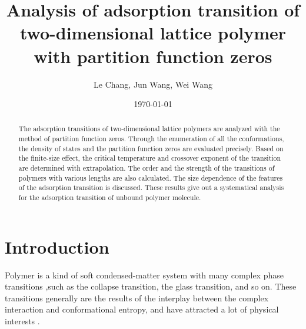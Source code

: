 \documentclass[aps,pre,twocolumn,showpacs,preprintnumbers,amsmath,amssymb]{revtex4-1}
\begin{document}
\title{Analysis of adsorption transition of two-dimensional
lattice polymer with partition function zeros} \author{Le Chang,
Jun Wang, Wei Wang}


\date{\today}

\begin{abstract} The adsorption transitions of two-dimensional
lattice polymers are analyzed with the method of partition
function zeros. Through the enumeration of all the
conformations, the density of states and the partition function
zeros are evaluated precisely. Based on the finite-size effect,
the critical temperature and crossover exponent of the
transition are determined with extrapolation. The order and the
strength of the transitions of polymers with various lengths are
also calculated. The size dependence of the features of the
adsorption transition is discussed. These results give out a
systematical analysis for the adsorption transition of unbound
polymer molecule. \end{abstract}


\maketitle

\section{Introduction}

Polymer is a kind of soft condensed-matter system with many
complex phase transitions \cite{LifshitzRMP78,PrivmanBook81,
deGennesBook79,PhysRep},such as the collapse
transition\cite{FloryJCP49, FloryBOOK67,WilliamsARPC81,OYJCP08},
the glass transition\cite{GibbsJCP58, JackleRPP86}, and so on.
These transitions generally are the results of the interplay
between the complex interaction and conformational entropy, and
have attracted a lot of physical interests
\cite{LifshitzRMP78,FloryJCP49,FloryBOOK67,WilliamsARPC81,GibbsJCP58,
JackleRPP86,deGennesBook79,StephenPLA75,RigByJCP1987,BellRMP93,
PrivmanBook81,ZivPCCP09,PCCP10,JCP09,JCP09b,JCP10,
PRL95,PhysRep,OYJCP08,BinderBook95}.
\end{document}
